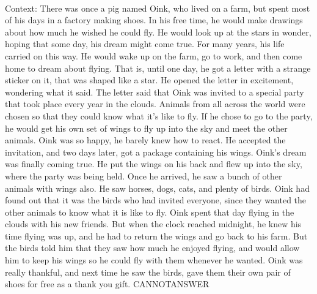 \documentclass[11pt,a4paper, onecolumn]{article}
\begin{document}
\\ Context: There was once a pig named Oink, who lived on a farm, but spent most of his days in a factory making shoes. In his free time, he would make drawings about how much he wished he could fly. He would look up at the stars in wonder, hoping that some day, his dream might come true. For many years, his life carried on this way. He would wake up on the farm, go to work, and then come home to dream about flying. That is, until one day, he got a letter with a strange sticker on it, that was shaped like a star. He opened the letter in excitement, wondering what it said. The letter said that Oink was invited to a special party that took place every year in the clouds. Animals from all across the world were chosen so that they could know what it's like to fly. If he chose to go to the party, he would get his own set of wings to fly up into the sky and meet the other animals. Oink was so happy, he barely knew how to react. He accepted the invitation, and two days later, got a package containing his wings. Oink's dream was finally coming true. He put the wings on his back and flew up into the sky, where the party was being held. Once he arrived, he saw a bunch of other animals with wings also. He saw horses, dogs, cats, and plenty of birds. Oink had found out that it was the birds who had invited everyone, since they wanted the other animals to know what it is like to fly. Oink spent that day flying in the clouds with his new friends. But when the clock reached midnight, he knew his time flying was up, and he had to return the wings and go back to his farm. But the birds told him that they saw how much he enjoyed flying, and would allow him to keep his wings so he could fly with them whenever he wanted. Oink was really thankful, and next time he saw the birds, gave them their own pair of shoes for free as a thank you gift. CANNOTANSWER
\end{document}
